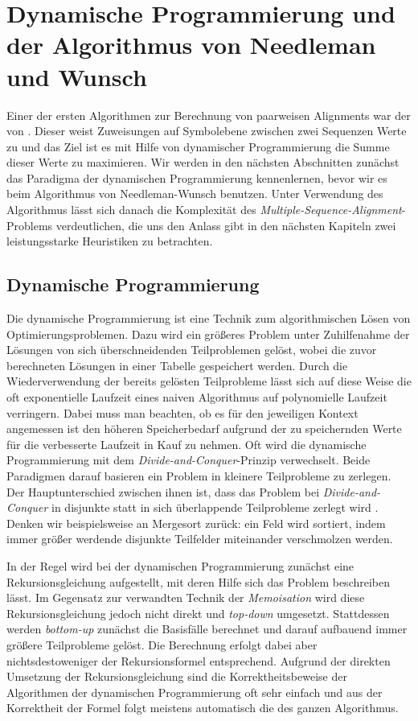 \chapter{Dynamische Programmierung und der Algorithmus von Needleman und Wunsch}
\label{ch:Dynamische Programmierung}

Einer der ersten Algorithmen zur Berechnung von paarweisen Alignments war der von \cite{nw70}. Dieser weist Zuweisungen auf Symbolebene zwischen zwei Sequenzen Werte zu und das Ziel ist es mit Hilfe von dynamischer Programmierung die Summe dieser Werte zu maximieren. Wir werden in den nächsten Abschnitten zunächst das Paradigma der dynamischen Programmierung kennenlernen, bevor wir es beim Algorithmus von Needleman-Wunsch benutzen. Unter Verwendung des Algorithmus lässt sich danach die Komplexität des \emph{Multiple-Sequence-Alignment}-Problems verdeutlichen, die uns den Anlass gibt in den nächsten Kapiteln zwei leistungsstarke Heuristiken zu betrachten.

\section{Dynamische Programmierung}

Die dynamische Programmierung ist eine Technik zum algorithmischen Lösen von Optimierungsproblemen. Dazu wird ein größeres Problem unter Zuhilfenahme der Lösungen von sich überschneidenden Teilproblemen gelöst, wobei die zuvor berechneten Lösungen in einer Tabelle gespeichert werden. Durch die Wiederverwendung der bereits gelösten Teilprobleme lässt sich auf diese Weise die oft exponentielle Laufzeit eines naiven Algorithmus auf polynomielle Laufzeit verringern. Dabei muss man beachten, ob es für den jeweiligen Kontext angemessen ist den höheren Speicherbedarf aufgrund der zu speichernden Werte für die verbesserte Laufzeit in Kauf zu nehmen. Oft wird die dynamische Programmierung mit dem \emph{Divide-and-Conquer}-Prinzip verwechselt. Beide Paradigmen darauf basieren ein Problem in kleinere Teilprobleme zu zerlegen. Der Hauptunterschied zwischen ihnen ist, dass das Problem bei \emph{Divide-and-Conquer} in disjunkte statt in sich überlappende Teilprobleme zerlegt wird \cite[S.359]{clrs09}. Denken wir beispielsweise an Mergesort zurück: ein Feld wird sortiert, indem immer größer werdende disjunkte Teilfelder miteinander verschmolzen werden.

In der Regel wird bei der dynamischen Programmierung zunächst eine Rekursionsgleichung aufgestellt, mit deren Hilfe sich das Problem beschreiben lässt. Im Gegensatz zur verwandten Technik der \emph{Memoisation} wird diese Rekursionsgleichung jedoch nicht direkt und \emph{top-down} umgesetzt. Stattdessen werden \emph{bottom-up} zunächst die Basisfälle berechnet und darauf aufbauend immer größere Teilprobleme gelöst. Die Berechnung erfolgt dabei aber nichtsdestoweniger der Rekursionsformel entsprechend. Aufgrund der direkten Umsetzung der Rekursionsgleichung sind die Korrektheitsbeweise der Algorithmen der dynamischen Programmierung oft sehr einfach und aus der Korrektheit der Formel folgt meistens automatisch die des ganzen Algorithmus.

